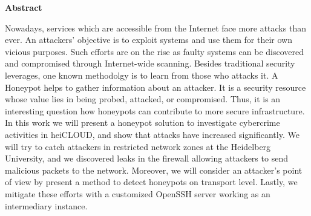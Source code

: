 \thispagestyle{empty}
\begin{center}
    \begin{minipage}[c][0.48\textheight][b]{0.9\textwidth}
        \small
        \begin{center}
            \textbf{Abstract}
        \end{center}\par
        \vspace{\baselineskip}
        Nowadays, services which are accessible from the Internet face more attacks than ever.
        An attackers' objective is to exploit systems and use them for their own vicious purposes.
        Such efforts are on the rise as faulty systems can be discovered and compromised through Internet-wide scanning.
        Besides traditional security leverages, one known methodolgy is to learn from those who attacks it.
        A Honeypot helps to gather information about an attacker.
        It is a security resource whose value lies in being probed, attacked, or compromised.
        Thus, it is an interesting question how honeypots can contribute to more secure infrastructure.
        In this work we will present a honeypot solution to investigate cybercrime activities in heiCLOUD, and show that attacks have increased significantly.
        We will try to catch attackers in restricted network zones at the Heidelberg University, and we discovered leaks in the firewall allowing attackers to send malicious packets to the network.
        Moreover, we will consider an attacker's point of view by present a method to detect honeypots on transport level.
        Lastly, we mitigate these efforts with a customized OpenSSH server working as an intermediary instance.
    \end{minipage}\par
    \vfill
\end{center}